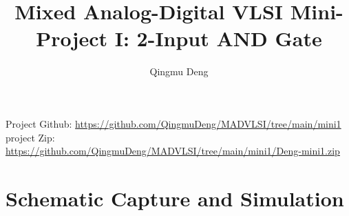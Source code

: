 \documentclass[11pt]{article}
\begin{document}
\title{Mixed Analog-Digital VLSI Mini-Project I: 2-Input AND Gate}
\author{Qingmu Deng}
\maketitle %

Project Github: \href{https://github.com/QingmuDeng/MADVLSI/tree/main/mini1}{https://github.com/QingmuDeng/MADVLSI/tree/main/mini1}
project Zip: \href{https://github.com/QingmuDeng/MADVLSI/tree/main/mini1/Deng-mini1.zip}{https://github.com/QingmuDeng/MADVLSI/tree/main/mini1/Deng-mini1.zip}
\section{Schematic Capture and Simulation}
\end{document}
